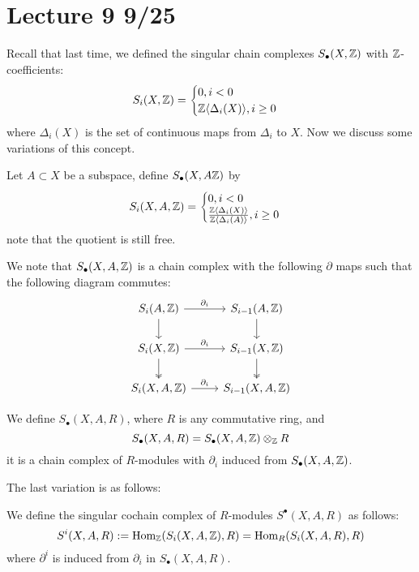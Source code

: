 \section{Lecture 9 9/25}
Recall that last time, we defined the singular chain complexes $S_\bullet(X,\mathbb{Z})$ with $\mathbb{Z}$-coefficients:
\begin{equation*}
    S_i(X,\mathbb{Z})=\begin{cases}
        0, i<0\\
        \mathbb{Z}\langle\Delta_i(X)\rangle, i\geq 0
    \end{cases}
\end{equation*}
where $\Delta_i(X)$ is the set of continuous maps from $\Delta_i$ to $X$. Now we discuss some variations of this concept.
\begin{defn}
    Let $A\subset X$ be a subspace, define $S_\bullet(X,A\mathbb{Z})$ by 
    \begin{equation*}
        S_i(X,A,\mathbb{Z})=\begin{cases}
            0, i<0\\
            \frac{\mathbb{Z}\langle\Delta_i(X)\rangle}{\mathbb{Z}\langle\Delta_i(A)\rangle}, i\geq 0
        \end{cases}
    \end{equation*}
    note that the quotient is still free.
\end{defn}
We note that $S_\bullet(X,A,\mathbb{Z})$ is a chain complex with the following $\partial$ maps such that the following diagram commutes:
\[\begin{tikzcd}
	{S_i(A,\Z)} & {S_{i-1}(A,\Z)} \\
	{S_i(X,\Z)} & {S_{i-1}(X,\Z)} \\
	{S_i(X,A,\Z)} & {S_{i-1}(X,A,\Z)}
	\arrow["{\partial_i}", from=1-1, to=1-2]
	\arrow[from=1-1, to=2-1]
	\arrow[from=1-2, to=2-2]
	\arrow["{\partial_i}", from=2-1, to=2-2]
	\arrow[two heads, from=2-1, to=3-1]
	\arrow[two heads, from=2-2, to=3-2]
	\arrow["{\partial_i}", from=3-1, to=3-2]
\end{tikzcd}\]
\begin{defn}[$S_\bullet(X,A,R)$]
    We define $S_\bullet(X,A,R)$, where $R$ is any commutative ring, and 
    \begin{equation*}
        S_\bullet(X,A,R)=S_\bullet(X,A,\mathbb{Z})\otimes_{\mathbb{Z}} R
    \end{equation*}
    it is a chain complex of $R$-modules with $\partial_i$ induced from $S_\bullet(X,A,\mathbb{Z})$.
\end{defn}
The last variation is as follows:
\begin{defn}
    We define the singular cochain complex of $R$-modules $S^\bullet(X,A,R)$ as follows:
    \begin{equation*}
        S^i(X,A,R):=\text{Hom}_{\mathbb{Z}}(S_i(X,A,\mathbb{Z}),R)=\text{Hom}_R(S_i(X,A,R),R)
    \end{equation*}
    where $\partial^i$ is induced from $\partial_i$ in $S_\bullet(X,A,R)$.
\end{defn}













